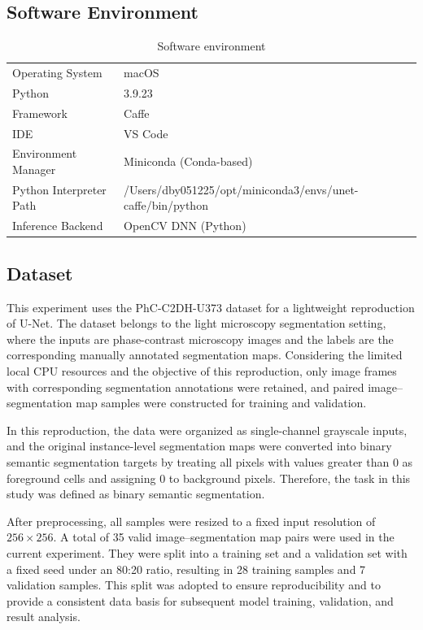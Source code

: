 \documentclass[11pt]{article}
\begin{document}
\subsection{Software Environment}
\begin{table}[H]
\centering
\caption{Software environment}
\begin{tabular}{ll}
\toprule
Operating System & macOS \\
Python & 3.9.23 \\
Framework & Caffe \\
IDE & VS Code \\
Environment Manager & Miniconda (Conda-based) \\
Python Interpreter Path & /Users/dby051225/opt/miniconda3/envs/unet-caffe/bin/python \\
Inference Backend & OpenCV DNN (Python) \\
\bottomrule
\end{tabular}
\end{table}

\subsection{Dataset}

This experiment uses the PhC-C2DH-U373 dataset for a lightweight reproduction of U-Net. The dataset belongs to the light microscopy segmentation setting, where the inputs are phase-contrast microscopy images and the labels are the corresponding manually annotated segmentation maps. Considering the limited local CPU resources and the objective of this reproduction, only image frames with corresponding segmentation annotations were retained, and paired image--segmentation map samples were constructed for training and validation.

In this reproduction, the data were organized as single-channel grayscale inputs, and the original instance-level segmentation maps were converted into binary semantic segmentation targets by treating all pixels with values greater than 0 as foreground cells and assigning 0 to background pixels. Therefore, the task in this study was defined as binary semantic segmentation.

After preprocessing, all samples were resized to a fixed input resolution of \(256 \times 256\). A total of 35 valid image--segmentation map pairs were used in the current experiment. They were split into a training set and a validation set with a fixed seed under an 80:20 ratio, resulting in 28 training samples and 7 validation samples. This split was adopted to ensure reproducibility and to provide a consistent data basis for subsequent model training, validation, and result analysis.
\end{document}
